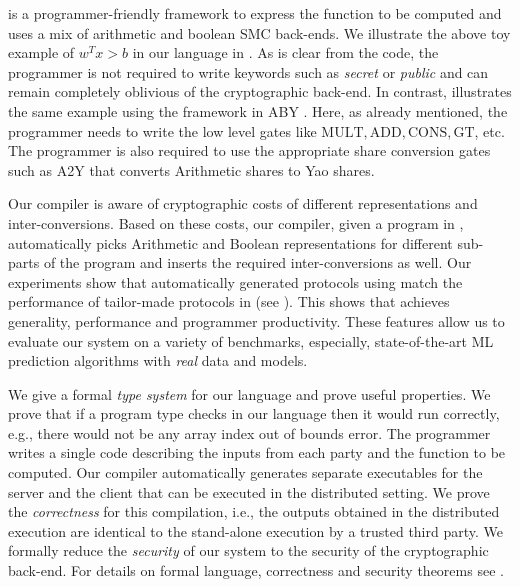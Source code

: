 \tool is a programmer-friendly framework to express the function to be computed and uses a mix of arithmetic and boolean SMC back-ends. We illustrate the above toy example of $w^Tx >b$ in our language in . As is clear from the code, the programmer is not required to write keywords such as {\em secret} or {\em public} and can remain completely oblivious of the cryptographic back-end. In contrast,  illustrates the same example using the framework in ABY \cite{aby}. Here, as already mentioned, the programmer needs to write the low level gates like $\mathrm{MULT, ADD, CONS, GT}$, etc. The programmer is also required to use the appropriate share conversion gates such as A2Y that converts Arithmetic shares to Yao shares. 

Our compiler is aware of cryptographic costs of different representations and inter-conversions.  Based on these costs, our compiler, given a program in \tool, automatically picks Arithmetic and Boolean representations for different sub-parts of the program and inserts the required inter-conversions as well. 
Our experiments show that automatically generated protocols using \tool match the performance of tailor-made protocols in \cite{minionn,shafindss} (see ). This shows that  \tool achieves generality, performance and programmer productivity. These features allow us to evaluate our system on a variety of benchmarks, especially, state-of-the-art ML prediction algorithms with \emph{real} data and models. 

We give a formal {\em type system} for our language and prove useful properties. We prove that if a program type checks in our language then it would run correctly, e.g., there would not be any array index out of bounds error. The programmer writes a single code describing the inputs from each party and the function to be computed. Our compiler automatically generates separate executables for the server and the client that can be executed in the distributed setting. We prove the {\em correctness} for this compilation, i.e., the outputs obtained in the distributed execution are identical to the stand-alone execution by a trusted third party. We formally reduce the {\em security} of our system to the security of the cryptographic back-end. For details on formal language, correctness and security theorems see .

